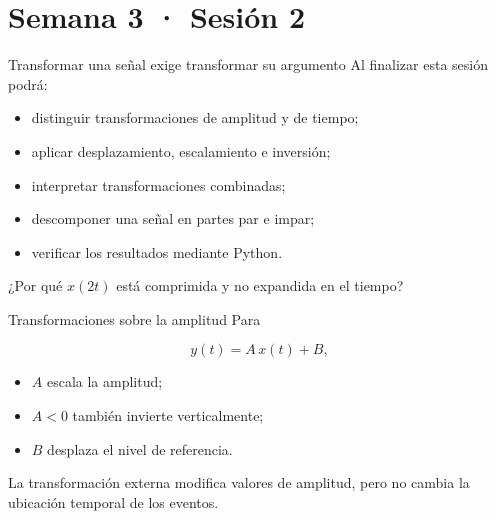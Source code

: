 \documentclass[
  ignorenonframetext,
  aspectratio=169,
  spanish,
  professionalfonts]{beamer}
\providecommand{\tightlist}{%
  \setlength{\itemsep}{0pt}\setlength{\parskip}{0pt}}
\begin{document}
\section{Semana 3 · Sesión 2}\label{semana-3-sesiuxf3n-2}

\begin{frame}{Transformar una señal exige transformar su argumento}
\protect{}\label{transformar-una-seuxf1al-exige-transformar-su-argumento}
Al finalizar esta sesión podrá:

\begin{itemize}
\tightlist
\item
  distinguir transformaciones de amplitud y de tiempo;
\item
  aplicar desplazamiento, escalamiento e inversión;
\item
  interpretar transformaciones combinadas;
\item
  descomponer una señal en partes par e impar;
\item
  verificar los resultados mediante Python.
\end{itemize}

\begin{tcolorbox}[enhanced jigsaw, arc=.35mm, bottomrule=.15mm, bottomtitle=1mm, breakable, colback=white, colbacktitle=quarto-callout-note-color!10!white, colframe=quarto-callout-note-color-frame, coltitle=black, left=2mm, leftrule=.75mm, opacityback=0, opacitybacktitle=0.6, rightrule=.15mm, title={Pregunta inicial}, titlerule=0mm, toprule=.15mm, toptitle=1mm]

¿Por qué \(x(2t)\) está comprimida y no expandida en el tiempo?

\end{tcolorbox}
\end{frame}

\begin{frame}{Transformaciones sobre la amplitud}
\protect{}\label{transformaciones-sobre-la-amplitud}
Para

\[y(t)=A\,x(t)+B,\]

\begin{itemize}
\tightlist
\item
  \(A\) escala la amplitud;
\item
  \(A<0\) también invierte verticalmente;
\item
  \(B\) desplaza el nivel de referencia.
\end{itemize}

\begin{tcolorbox}[enhanced jigsaw, arc=.35mm, bottomrule=.15mm, bottomtitle=1mm, breakable, colback=white, colbacktitle=quarto-callout-important-color!10!white, colframe=quarto-callout-important-color-frame, coltitle=black, left=2mm, leftrule=.75mm, opacityback=0, opacitybacktitle=0.6, rightrule=.15mm, title={Interpretación}, titlerule=0mm, toprule=.15mm, toptitle=1mm]

La transformación externa modifica valores de amplitud, pero no cambia
la ubicación temporal de los eventos.

\end{tcolorbox}
\end{frame}
\end{document}
